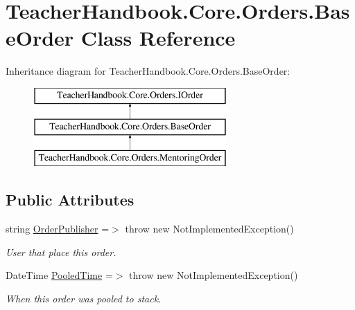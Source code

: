 \hypertarget{class_teacher_handbook_1_1_core_1_1_orders_1_1_base_order}{}\section{Teacher\+Handbook.\+Core.\+Orders.\+Base\+Order Class Reference}
\label{class_teacher_handbook_1_1_core_1_1_orders_1_1_base_order}
Inheritance diagram for Teacher\+Handbook.\+Core.\+Orders.\+Base\+Order\+:\begin{figure}[H]
\begin{center}
\leavevmode
\includegraphics[height=3.000000cm]{df/d39/class_teacher_handbook_1_1_core_1_1_orders_1_1_base_order}
\end{center}
\end{figure}
\subsection*{Public Attributes}
\begin{DoxyCompactItemize}
\item 
string \mbox{\hyperlink{class_teacher_handbook_1_1_core_1_1_orders_1_1_base_order_a59ec952bde8892fe9c48d34c838be374}{Order\+Publisher}} =$>$ throw new Not\+Implemented\+Exception()
\begin{DoxyCompactList}\small\item\em User that place this order. \end{DoxyCompactList}\item 
Date\+Time \mbox{\hyperlink{class_teacher_handbook_1_1_core_1_1_orders_1_1_base_order_ac11e738e1d6b9e7ff3fe4b55e2bd50d5}{Pooled\+Time}} =$>$ throw new Not\+Implemented\+Exception()
\begin{DoxyCompactList}\small\item\em When this order was pooled to stack. \end{DoxyCompactList}\end{DoxyCompactItemize}
